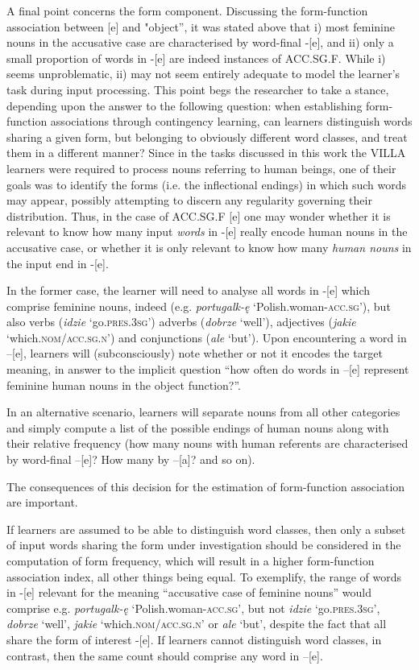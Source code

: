 A final point concerns the form component. Discussing the form-function association between [e] and "object”, it was stated above that i) most feminine nouns in the accusative case are characterised by word-final -[e], and ii) only a small proportion of words in -[e] are indeed instances of ACC.SG.F. While i) seems unproblematic, ii) may not seem entirely adequate to model the learner’s task during input processing. This point begs the researcher to take a stance, depending upon the answer to the following question: when establishing form-function associations through contingency learning, can learners distinguish words sharing a given form, but belonging to obviously different word classes, and treat them in a different manner? Since in the tasks discussed in this work the VILLA learners were required to process nouns referring to human beings, one of their goals was to identify the forms (i.e. the inflectional endings) in which such words may appear, possibly attempting to discern any regularity governing their distribution. Thus, in the case of ACC.SG.F [e] one may wonder whether it is relevant to know how many input \textit{words} in -[e] really encode human nouns in the accusative case, or whether it is only relevant to know how many \textit{human nouns} in the input end in -[e]. 

In the former case, the learner will need to analyse all words in -[e] which comprise feminine nouns, indeed (e.g. \textit{portugalk-ę} ‘Polish.woman-\textsc{acc.sg’}), but also verbs (\textit{idzie} ‘go.\textsc{pres.3sg’}) adverbs (\textit{dobrze} ‘well’), adjectives (\textit{jakie} ‘which.\textsc{nom/acc.sg.n}’) and conjunctions (\textit{ale} ‘but’). Upon encountering a word in –[e], learners will (subconsciously) note whether or not it encodes the target meaning, in answer to the implicit question “how often do words in –[e] represent feminine human nouns in the object function?”.

In an alternative scenario, learners will separate nouns from all other categories and simply compute a list of the possible endings of human nouns along with their relative frequency (how many nouns with human referents are characterised by word-final –[e]? How many by –[a]? and so on).

The consequences of this decision for the estimation of form-function association are important. 

If learners are assumed to be able to distinguish word classes, then only a subset of input words sharing the form under investigation should be considered in the computation of form frequency, which will result in a higher form-function association index, all other things being equal. To exemplify, the range of words in -[e] relevant for the meaning “accusative case of feminine nouns” would comprise e.g. \textit{portugalk-ę} ‘Polish.woman-\textsc{acc.sg’}, but not \textit{idzie} ‘go.\textsc{pres.3sg}’, \textit{dobrze} ‘well’, \textit{jakie} ‘which.\textsc{nom/acc.sg.n}’ or \textit{ale} ‘but’, despite the fact that all share the form of interest -[e]. If learners cannot distinguish word classes, in contrast, then the same count should comprise any word in –[e].

